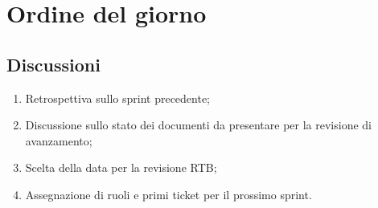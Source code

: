 \section{Ordine del giorno} \label{sec:agenda}
\subsection{Discussioni} \label{subsec:discussione}
\begin{enumerate}
    \item Retrospettiva sullo sprint precedente;
    \item Discussione sullo stato dei documenti da presentare per la revisione di avanzamento;
    \item Scelta della data per la revisione RTB;
    \item Assegnazione di ruoli e primi ticket per il prossimo sprint. 
\end{enumerate}
